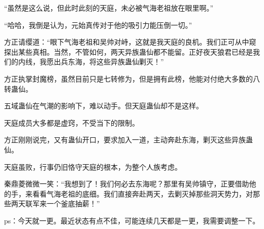 \begin{this_body}
“虽然是这么说，但此时此刻的天庭，未必被气海老祖放在眼里啊。”

“哈哈，我倒是认为，元始真传对于他的吸引力能压倒一切。”

方正请缨道：“眼下气海老祖和吴帅对峙，这就是我天庭的良机。我们正可从中窥探出某些真相。当然，不管如何，两天异族蛊仙都不能留。正好夜天狼君已经是我们的内线，我愿出兵东海，将这些异族蛊仙剿灭！”

方正执掌封魔榜，虽然目前只是七转修为，但是拥有此榜，他能对付绝大多数的八转蛊仙。

五域蛊仙在气潮的影响下，难以动手。但天庭蛊仙却不是这样。

天庭成员大多都是虚窍，不受当下的限制。

方正刚刚说完，又有蛊仙开口，要求加入一道，主动奔赴东海，剿灭这些异族蛊仙。

天庭虽败，行事仍旧恪守天庭的根本，为整个人族考虑。

秦鼎菱微微一笑：“我想到了！我们何必去东海呢？那里有吴帅镇守，正要借助他的手，来看看气海老祖的底细。我们直接奔赴两天，去剿灭掉那些洞天势力，对那些两天联军来一个釜底抽薪！”

ps：今天就一更。最近状态有点不佳，可能连续几天都是一更，我需要调整一下。

\end{this_body}

